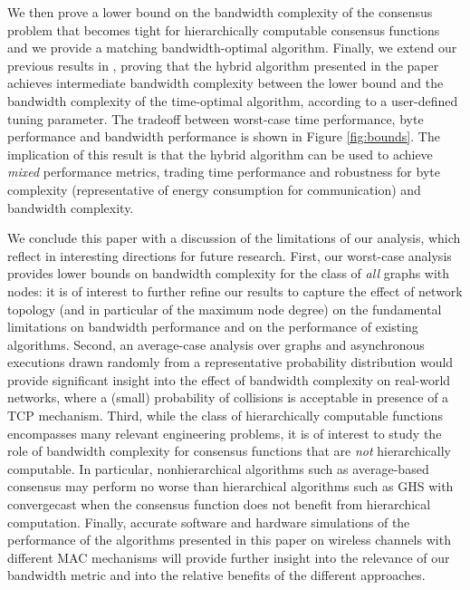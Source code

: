\documentclass[letterpaper,10pt,conference]{ieeeconf}
\begin{document}
We then prove a lower bound on the bandwidth complexity of the consensus problem that becomes tight for hierarchically computable consensus functions and we provide a matching bandwidth-optimal algorithm. 
Finally, we extend our previous results in \cite{FR-MP:13}, proving that the hybrid algorithm presented in the paper achieves intermediate bandwidth complexity between the lower bound and the bandwidth complexity of the time-optimal algorithm, according to a user-defined tuning parameter. The tradeoff between worst-case time performance, byte performance and bandwidth performance is shown in Figure \ref{fig:bounds}. The implication of this result is that the hybrid algorithm can be used to achieve \emph{mixed} performance metrics, trading time performance and robustness for byte complexity (representative of energy consumption for communication) and bandwidth complexity.

We conclude this paper with a discussion of the limitations of our analysis, which reflect in interesting directions for future research. First, our worst-case analysis provides lower bounds on bandwidth complexity for the class  of \emph{all} graphs with  nodes: it is of interest to further refine our results to capture the effect of network topology (and in particular of the maximum node degree) on the fundamental limitations on bandwidth performance and on the performance of existing algorithms. Second, an average-case analysis over graphs and asynchronous executions drawn randomly from a representative probability distribution would provide significant insight into the effect of bandwidth complexity on real-world networks, where a (small) probability of collisions is acceptable in presence of a TCP mechanism. Third, while the class of hierarchically computable functions encompasses many relevant engineering problems, it is of interest to study the role of bandwidth complexity for consensus functions that are \emph{not} hierarchically computable. In particular, nonhierarchical algorithms such as average-based consensus may perform no worse than hierarchical algorithms such as GHS with convergecast when the consensus function does not benefit from hierarchical computation. Finally, accurate software and hardware simulations of the performance of the algorithms presented in this paper on wireless channels with different MAC mechanisms will provide further insight into the relevance of our bandwidth metric and into the relative benefits of the different approaches.




\end{document}
